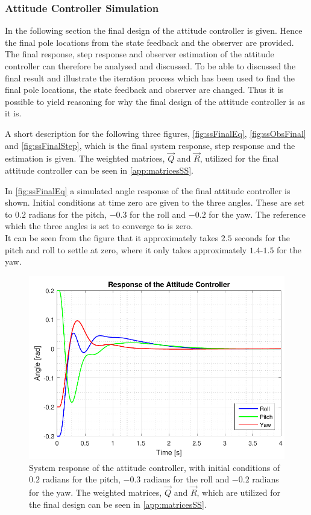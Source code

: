 \subsubsection{Attitude Controller Simulation}
In the following section the final design of the attitude controller is given. Hence the final pole locations from the state feedback and the observer are provided. The final response, step response and observer estimation of the attitude controller can therefore be analysed and discussed. To be able to discussed the final result and illustrate the iteration process which has been used to find the final pole locations, the state feedback and observer are changed. Thus it is possible to yield reasoning for why the final design of the attitude controller is as it is.

A short description for the following three figures, \autoref{fig:ssFinalEq}, \autoref{fig:ssObsFinal} and \autoref{fig:ssFinalStep}, which is the final system response, step response and the estimation is given. The weighted matrices, $\vec{Q}$ and $\vec{R}$, utilized for the final attitude controller can be seen in \autoref{app:matricesSS}.

In \autoref{fig:ssFinalEq} a simulated angle response of the final attitude controller is shown. Initial conditions at time zero are given to the three angles. These are set to $0.2$ radians for the pitch, $-0.3$ for the roll and $-0.2$ for the yaw. The reference which the three angles is set to converge to is zero. \\ It can be seen from the figure that it approximately takes $2.5$ seconds for the pitch and roll to settle at zero, where it only takes approximately $1.4$-$1.5$ for the yaw.

\begin{figure}[H]
	\centering
	\includegraphics[scale=0.8]{figures/ssFinalEq.pdf}
	\caption{System response of the attitude controller, with initial conditions of $0.2$ radians for the pitch, $-0.3$ radians for the roll and $-0.2$ radians for the yaw. The weighted matrices, $\vec{Q}$ and $\vec{R}$, which are utilized for the final design can be seen in \autoref{app:matricesSS}.}
	\label{fig:ssFinalEq}
\end{figure}

